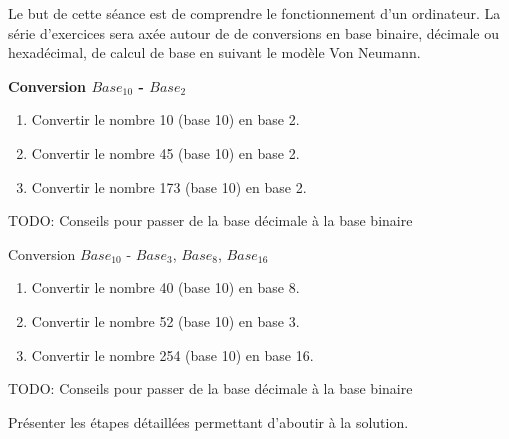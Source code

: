 



\ShowSolutiontrue
\ShowConseiltrue
\titre
{}

Le but de cette séance est de comprendre le fonctionnement d'un ordinateur. La série d'exercices sera axée autour de de conversions en base binaire, décimale ou hexadécimal, de calcul de base en suivant le modèle Von Neumann. \\


\begin{Exercice}[5 minutes]  \textbf{Conversion $Base_{10}$ - $Base_2$} \auto\\
    \begin{enumerate}
        \item Convertir le nombre 10 (base 10) en base 2.
        \item Convertir le nombre 45 (base 10) en base 2.
        \item Convertir le nombre 173 (base 10) en base 2.
    \end{enumerate}

    \begin{conseil}
        TODO: Conseils pour passer de la base décimale à la base binaire
    \end{conseil}
\end{Exercice}


\begin{Exercice}[5 minutes]  Conversion $Base_{10}$ - $Base_3$, $Base_8$, $Base_{16}$ \auto\\
    \begin{enumerate}
        \item Convertir le nombre 40 (base 10) en base 8.
        \item Convertir le nombre 52 (base 10) en base 3.
        \item Convertir le nombre 254 (base 10) en base 16.
    \end{enumerate}

    \begin{conseil}
        TODO: Conseils pour passer de la base décimale à la base binaire
    \end{conseil}
    \begin{solution}
        Présenter les étapes détaillées permettant d'aboutir à la solution.
    \end{solution}
\end{Exercice}

